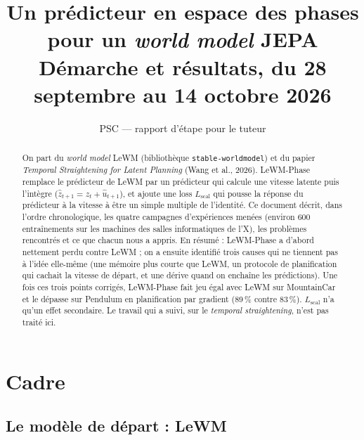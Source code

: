 \documentclass[11pt,a4paper]{article}
\title{Un prédicteur en espace des phases\\pour un \emph{world model} JEPA\\[0.4em]
\large Démarche et résultats, du 28 septembre au 14 octobre 2026}
\author{PSC --- rapport d'étape pour le tuteur}
\date{}
\newcommand{\Lscal}{L_{\mathrm{scal}}}
\begin{document}
\maketitle

\begin{abstract}
On part du \emph{world model} LeWM (bibliothèque \texttt{stable-worldmodel}) et du papier
\emph{Temporal Straightening for Latent Planning} (Wang et al., 2026). LeWM-Phase remplace le
prédicteur de LeWM par un prédicteur qui calcule une vitesse latente puis l'intègre
($\hat z_{t+1} = z_t + \hat u_{t+1}$), et ajoute une loss $\Lscal$ qui pousse la réponse du
prédicteur à la vitesse à être un simple multiple de l'identité. Ce document décrit, dans
l'ordre chronologique, les quatre campagnes d'expériences menées (environ 600 entraînements
sur les machines des salles informatiques de l'X), les problèmes rencontrés et ce que chacun
nous a appris. En résumé : LeWM-Phase a d'abord nettement perdu contre LeWM ; on a ensuite
identifié trois causes qui ne tiennent pas à l'idée elle-même (une mémoire plus courte que
LeWM, un protocole de planification qui cachait la vitesse de départ, et une dérive quand on
enchaîne les prédictions). Une fois ces trois points corrigés, LeWM-Phase fait jeu égal avec
LeWM sur MountainCar et le dépasse sur Pendulum en planification par gradient
(89\,\% contre 83\,\%). $\Lscal$ n'a qu'un effet secondaire. Le travail qui a suivi, sur le
\emph{temporal straightening}, n'est pas traité ici.
\end{abstract}

\tableofcontents

\section{Cadre}

\subsection{Le modèle de départ : LeWM}
\end{document}
